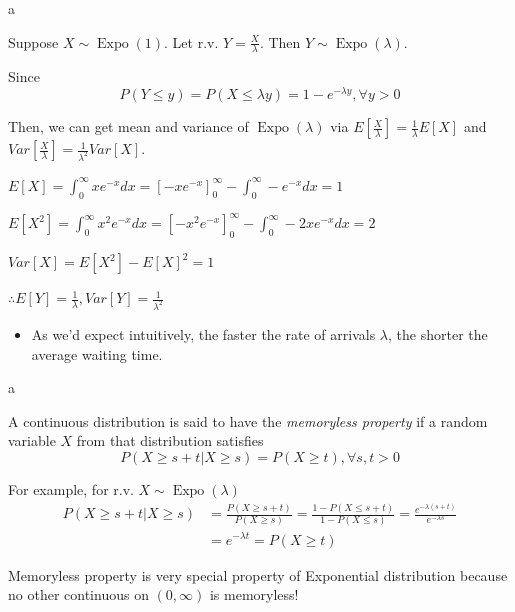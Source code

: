 \documentclass[8pt]{beamer}
\newcommand{\ti}[1]{\textit{#1}}
\newcommand{\myexpo}[1]{\operatorname{Expo}\!\left(#1\right)}
\begin{document}
 \begin{frame}{a}
 \begin{example}
    Suppose $X \sim \myexpo{1}$. Let r.v. $Y= \frac{X}{\lambda}$. Then $Y \sim \myexpo{\lambda}$.

    Since \[P(Y\leq y) =P(X \leq \lambda y) = 1 - e^{-\lambda y}, \forall y >0
    \]

    Then, we can get mean and variance of $\myexpo{\lambda}$ via $E[\frac{X}{\lambda}] = \frac{1}{\lambda} E[X]$ and $Var [\frac{X}{\lambda}] = \frac{1}{\lambda^2} Var[X]$.

    $E[X] = \int_0^\infty x e^{-x} dx = \left[ -x e^{-x} \right]^\infty_0 - \int_0^\infty -e^{-x} dx =  1$

    $E[X^2] = \int_0^\infty x^2 e^{-x} dx = \left[ -x^2 e^{-x}\right]^{\infty}_0 - \int^\infty_0 -2x e^{-x} dx = 2$

    $Var[X] = E[X^2] -E[X]^2 = 1$

    $\therefore E[Y] = \frac{1}{\lambda}, Var[Y] = \frac{1}{\lambda^2}$
 \end{example}

 \begin{itemize}
 \item As we'd expect intuitively, the faster the rate of arrivals $\lambda$, the shorter the average waiting time.
 \end{itemize}
 \end{frame}

 \begin{frame}{a}
    \begin{definition}
        A continuous distribution is said to have the \ti{memoryless property} if a random variable $X$ from that distribution satisfies
        \[
            P(X\geq s + t | X\geq s) = P(X\geq t), \forall s,t >0
        \]
    \end{definition}


    For example, for r.v. $X \sim \myexpo{\lambda}$
    \[
        \begin{aligned}
        P(X\geq s+t | X \geq s) &= \frac{P(X \geq s+t)}{P(X \geq s)} = \frac{1 - P(X \leq s+t)}{1 - P(X \leq s)} = \frac{e^{-\lambda (s+t)}}{e^{-\lambda s}} \\
        &= e^{-\lambda t} = P(X \geq t)
        \end{aligned}
    \]

    Memoryless property is very special property of Exponential distribution because no other continuous on $(0,\infty)$ is memoryless!
\end{frame}
\end{document}
